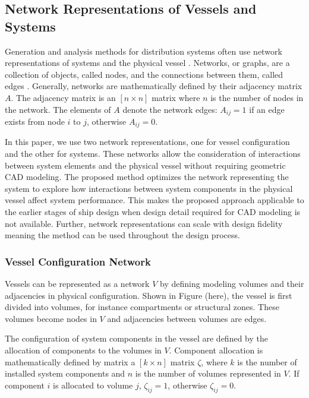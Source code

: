 \documentclass[preprint,12pt]{elsarticle}
\begin{document}
\subsection{Network Representations of Vessels and Systems} 
Generation and analysis methods for distribution systems often use network representations of systems and the physical vessel \cite{Gillespie2013,Rigterink2014,Dellsy2015,Trapp2015}. Networks, or graphs, are a collection of objects, called nodes, and the connections between them, called edges \cite{Newman2003}. Generally, networks are mathematically defined by their adjacency matrix $A$. The adjacency matrix is an $[n\times n]$ matrix where $n$ is the number of nodes in the network. The elements of $A$ denote the network edges: $A_{ij}=1$ if an edge exists from node $i$ to $j$, otherwise $A_{ij}=0$.

In this paper, we use two network representations, one for vessel configuration and the other for systems. These networks allow the consideration of interactions between system elements and the physical vessel without requiring geometric CAD modeling. The proposed method optimizes the network representing the system to explore how interactions between system components in the physical vessel affect system performance. This makes the proposed approach applicable to the earlier stages of ship design when design detail required for CAD modeling is not available. Further, network representations can scale with design fidelity \cite{Rigterink2014, Gillespie2012} meaning the method can be used throughout the design process.

\subsubsection{Vessel Configuration Network} \label{sec:vesselmodel}
Vessels can be represented as a network $V$ by defining modeling volumes and their adjacencies in physical configuration. Shown in Figure (here), the vessel is first divided into volumes, for instance compartments or structural zones. These volumes become nodes in $V$ and adjacencies between volumes are edges. 

The configuration of system components in the vessel are defined by the allocation of components to the volumes in $V$. Component allocation is mathematically defined by matrix a $[k \times n]$ matrix $\zeta$, where $k$ is the number of installed system components and $n$ is the number of volumes represented in $V$. If component $i$ is allocated to volume $j$, $\zeta_{ij}=1$, otherwise $\zeta_{ij}=0$.   
\end{document}
